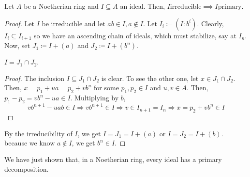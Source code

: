 \begin{prop}
    Let $A$ be a Noetherian ring and $I \subseteq A$ an ideal.
    Then,\linebreak
    ${I \text{irreducible} \implies I \text{primary}}$.
    \begin{proof}
        Let $I$ be irreducible and let $ab \in I, a \notin I$.
        Let $I_i \coloneqq (I: b^i)$.
        Clearly, $I_i \subseteq I_{i+1}$
        so we have an ascending chain of ideals, which must stabilize, say at $I_n$.
        Now, set $J_1 \coloneqq I + (a)$ and $ J_2 \coloneqq I + (b^n)$.
        \begin{claim}
            $I = J_1 \cap J_2$.
            \begin{proof}
                The inclusion $I \subseteq J_1 \cap J_2$ is clear.
        To see the other one, let $x \in J_1 \cap J_2$.
        Then, $x = p_1 + ua = p_2 + vb^n $ for some $p_1, p_2 \in I$ and $u, v \in A$.
        Then, $p_1 - p_2 = vb^n - ua \in I$.
        Multiplying by $b$,
        \[
            vb^{n+1} - uab \in I
            \Rightarrow vb^{n+1}\in I
            \Rightarrow v \in I_{n+1} = I_n
            \Rightarrow x = p_2 + vb^n \in I
        \]
            \end{proof}
        \end{claim}
        \noindent By the irreducibility of $I$, we get $I = J_1 = I + (a)$ or $I = J_2 = I + (b)$.
        because we know $a \notin I$, we get $b^n \in I$.
    \end{proof}

\end{prop}

\begin{rk}
    We have just shown that, in a Noetherian ring,
    every ideal has a primary decomposition.
\end{rk}